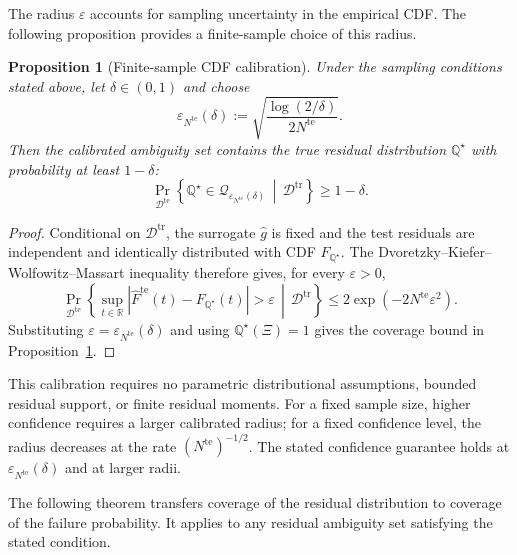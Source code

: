 \documentclass[review,11pt,3p,authoryear,nopreprintline]{elsarticle}
\newtheorem{proposition}{Proposition}
\begin{document}
The radius $\varepsilon$ accounts for sampling uncertainty in the empirical CDF. The following proposition provides a finite-sample choice of this radius.

\begin{proposition}[Finite-sample CDF calibration]
  \label{proposition-01}
  Under the sampling conditions stated above, let $\delta\in(0,1)$ and choose
  \begin{equation}
    \varepsilon_{N^{\mathrm{te}}}(\delta):=\sqrt{\frac{\log(2/\delta)}{2N^{\mathrm{te}}}}.
    \label{eq-cdf-radius}
  \end{equation}
  Then the calibrated ambiguity set contains the true residual distribution $\mathbb{Q}^{\star}$ with probability at least $1 - \delta$:
  \begin{equation}
    \Pr_{\mathcal D^{\mathrm{te}}}\left\{\mathbb Q^\star\in\mathscr Q_{\varepsilon_{N^{\mathrm{te}}}(\delta)}\,\middle|\,\mathcal D^{\mathrm{tr}}\right\}\ge1-\delta.
    \label{eq-cdf-coverage}
  \end{equation}
\end{proposition}
\begin{proof}
  Conditional on $\mathcal D^{\mathrm{tr}}$, the surrogate $\hat g$ is fixed and the test residuals are independent and identically distributed with CDF $F_{\mathbb Q^\star}$. The Dvoretzky--Kiefer--Wolfowitz--Massart inequality therefore gives, for every $\varepsilon>0$,
  \[
    \Pr_{\mathcal D^{\mathrm{te}}}\left\{\sup_{t\in\mathbb R}\left|\widehat F^{\mathrm{te}}(t)-F_{\mathbb Q^\star}(t)\right|>\varepsilon\,\middle|\,\mathcal D^{\mathrm{tr}}\right\}\le2\exp(-2N^{\mathrm{te}}\varepsilon^2).
  \]
  Substituting $\varepsilon=\varepsilon_{N^{\mathrm{te}}}(\delta)$ and using $\mathbb Q^\star(\Xi)=1$ gives the coverage bound in Proposition~\ref{proposition-01}.
\end{proof}

This calibration requires no parametric distributional assumptions, bounded residual support, or finite residual moments. For a fixed sample size, higher confidence requires a larger calibrated radius; for a fixed confidence level, the radius decreases at the rate $(N^{\mathrm{te}})^{-1/2}$. The stated confidence guarantee holds at $\varepsilon_{N^{\mathrm{te}}}(\delta)$ and at larger radii.

The following theorem transfers coverage of the residual distribution to coverage of the failure probability. It applies to any residual ambiguity set satisfying the stated condition.
\end{document}
